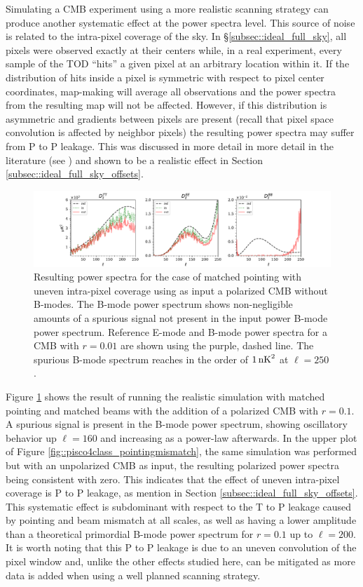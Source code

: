 \documentclass[a4paper,11pt]{article}
\begin{document}
Simulating a CMB experiment using a more realistic scanning strategy can produce another systematic effect at the power spectra level. This source of noise is related to the intra-pixel coverage of the sky. In \S\ref{subsec::ideal_full_sky}, all pixels were observed exactly at their centers while, in a real experiment, every sample of the TOD ``hits'' a given pixel at an arbitrary location within it. If the distribution of hits inside a pixel is symmetric with respect to pixel center coordinates, map-making will average all observations and the power spectra from the resulting map will not be affected. However, if this distribution is asymmetric and gradients between pixels are present (recall that pixel space convolution is affected by neighbor pixels) the resulting power spectra may suffer from P to P leakage. This was discussed in more detail in more detail in the literature (see \cite{2005poutanen}) and shown to be a realistic effect in Section \ref{subsec::ideal_full_sky_offsets}.

\begin{figure}
	\centering
	\includegraphics[width=1.0\textwidth, trim = {2.4cm 0.0cm 2.3cm 0.0cm}, clip ]{figures/intrapixel_2.pdf}
	\caption{Resulting power spectra for the case of matched pointing with uneven intra-pixel coverage using as input a polarized CMB without B-modes. The B-mode power spectrum shows non-negligible amounts of a spurious signal not present in the input power B-mode power spectrum. Reference E-mode and B-mode power spectra for a CMB with $r=0.01$ are shown using the purple, dashed line. The spurious B-mode spectrum reaches in the order of $1\, \rm{nK}^2$ at $\ell = 250$.}
	\label{fig::pisco4class_intrapixel}
\end{figure}

Figure \ref{fig::pisco4class_intrapixel} shows the result of running the realistic simulation with matched pointing and matched beams with the addition of a polarized CMB with $r=0.1$. A spurious signal is present in the B-mode power spectrum, showing oscillatory behavior up $\ell=160$ and increasing as a power-law afterwards. In the upper plot of Figure \ref{fig::pisco4class_pointingmismatch}, the same simulation was performed but with an unpolarized CMB as input, the resulting polarized power spectra being consistent with zero. This indicates that the effect of uneven intra-pixel coverage is P to P leakage, as mention in Section \ref{subsec::ideal_full_sky_offsets}. This systematic effect is subdominant with respect to the T to P leakage caused by pointing and beam mismatch at all scales, as well as having a lower amplitude than a theoretical primordial B-mode power spectrum for $r=0.1$ up to $\ell=200$. It is worth noting that this P to P leakage is due to an uneven convolution of the pixel window and, unlike the other effects studied here, can be mitigated as more data is added when using a well planned scanning strategy.
\end{document}
